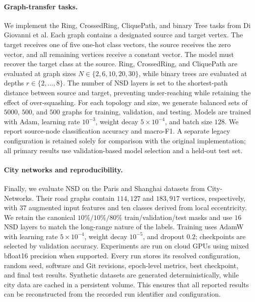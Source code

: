 \paragraph{Graph-transfer tasks.}
We implement the Ring, CrossedRing, CliquePath, and binary Tree tasks from
Di Giovanni et al. Each graph contains a designated source and target vertex.
The target receives one of five one-hot class vectors, the source receives the
zero vector, and all remaining vertices receive a constant vector. The model
must recover the target class at the source. Ring, CrossedRing, and CliquePath
are evaluated at graph sizes
$N \in \{2,6,10,20,30\}$, while binary trees are evaluated at depths
$r \in \{2,\ldots,8\}$. The number of NSD layers is set to the shortest-path
distance between source and target, preventing under-reaching while retaining
the effect of over-squashing. For each topology and size, we generate balanced
sets of $5000$, $500$, and $500$ graphs for training, validation, and testing.
Models are trained with Adam, learning rate $10^{-3}$, weight decay
$5 \times 10^{-4}$, and batch size $128$. We report source-node
classification accuracy and macro-F1. A separate legacy configuration is
retained solely for comparison with the original implementation; all primary
results use validation-based model selection and a held-out test set.

\paragraph{City networks and reproducibility.}
Finally, we evaluate NSD on the Paris and Shanghai datasets from
City-Networks. Their road graphs contain $114{,}127$ and $183{,}917$ vertices,
respectively, with $37$ augmented input features and ten classes derived from
local eccentricity. We retain the canonical $10\%/10\%/80\%$
train/validation/test masks and use $16$ NSD layers to match the long-range
nature of the labels. Training uses AdamW with learning rate
$5 \times 10^{-4}$, weight decay $10^{-5}$, and dropout $0.2$; checkpoints
are selected by validation accuracy. Experiments are run on cloud GPUs using
mixed bfloat16 precision when supported. Every run stores its resolved
configuration, random seed, software and Git revisions, epoch-level metrics,
best checkpoint, and final test results. Synthetic datasets are generated
deterministically, while city data are cached in a persistent volume. This
ensures that all reported results can be reconstructed from the recorded run
identifier and configuration.

